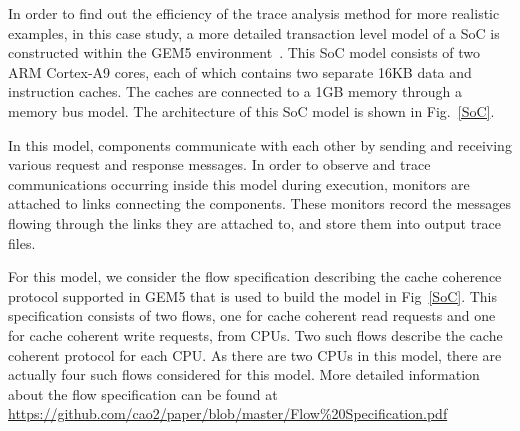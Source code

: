 \documentclass[conference]{IEEEtran}
\begin{document}
In order to find out the efficiency of the trace analysis method for more realistic examples, in this case study, a more detailed transaction level model of a SoC is constructed within the GEM5 environment~\cite{Binkert2011}.  This SoC model consists of two ARM Cortex-A9 cores, each of which contains two separate 16KB data and instruction caches.  The caches are connected to a 1GB memory through a memory bus model.  The architecture of this SoC model is shown in Fig.~\ref{SoC}.  

In this model, components communicate with each other by sending and receiving various request and response messages.  In order to observe and trace communications occurring inside this model during execution, monitors are attached to links connecting the components. These monitors record the messages flowing through the links they are attached to, and store them into output trace files.




For this model, we consider the flow specification describing the cache coherence protocol supported in GEM5 that is used to build the model in Fig~\ref{SoC}.  This specification consists of two flows, one for cache coherent read requests and one for  cache coherent write requests, from CPUs.  Two such flows describe the cache coherent protocol for each CPU.  As there are two CPUs in this model, there are actually four such flows considered for this model.  More detailed information about the flow specification can be found at \url{https://github.com/cao2/paper/blob/master/Flow\%20Specification.pdf}
\end{document}

